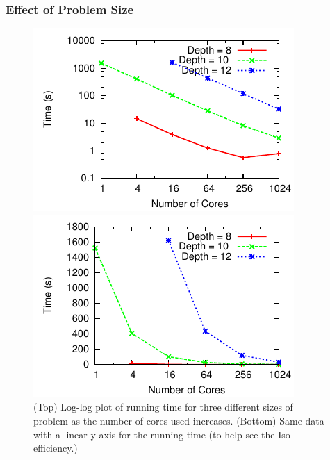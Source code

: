 \documentclass[times, 10pt,twocolumn]{article}
\begin{document}
\subsubsection{Effect of Problem Size}
\begin{figure}[h]
\centering
\begin{minipage}{0.7\linewidth}
\includegraphics[width=\columnwidth]{plots/3depths.pdf}
\end{minipage}
\centering
\begin{minipage}{0.7\linewidth}
\includegraphics[width=\columnwidth]{plots/3depthsnolog.pdf}
\end{minipage}
\vspace{-0.1in}
\caption{(Top) Log-log plot of running time for three different sizes of problem as the number of cores used increases.
(Bottom) Same data with a linear y-axis for the running time (to help see the Iso-efficiency.)}
\vspace{-0.2in}
\label{3depths}
\end{figure}
\end{document}

